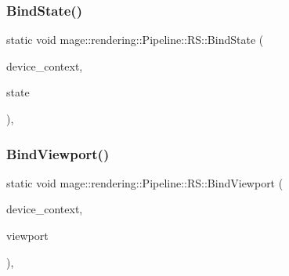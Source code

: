 \hypertarget{structmage_1_1rendering_1_1_pipeline_1_1_r_s_a828e80ca97ec6827434864cf8115766d}{}\label{structmage_1_1rendering_1_1_pipeline_1_1_r_s_a828e80ca97ec6827434864cf8115766d} 
\subsubsection{\texorpdfstring{Bind\+State()}{BindState()}}
{\footnotesize\ttfamily static void mage\+::rendering\+::\+Pipeline\+::\+R\+S\+::\+Bind\+State (\begin{DoxyParamCaption}\item[{I\+D3\+D11\+Device\+Context \&}]{device\+\_\+context,  }\item[{I\+D3\+D11\+Rasterizer\+State $\ast$}]{state }\end{DoxyParamCaption})\hspace{0.3cm}{\ttfamily [static]}, {\ttfamily [noexcept]}}

\hypertarget{structmage_1_1rendering_1_1_pipeline_1_1_r_s_a9d44e3f07e0bd12c736b46b7b05693f7}{}\label{structmage_1_1rendering_1_1_pipeline_1_1_r_s_a9d44e3f07e0bd12c736b46b7b05693f7} 
\subsubsection{\texorpdfstring{Bind\+Viewport()}{BindViewport()}}
{\footnotesize\ttfamily static void mage\+::rendering\+::\+Pipeline\+::\+R\+S\+::\+Bind\+Viewport (\begin{DoxyParamCaption}\item[{I\+D3\+D11\+Device\+Context \&}]{device\+\_\+context,  }\item[{const D3\+D11\+\_\+\+V\+I\+E\+W\+P\+O\+RT \&}]{viewport }\end{DoxyParamCaption})\hspace{0.3cm}{\ttfamily [static]}, {\ttfamily [noexcept]}}

\hypertarget{structmage_1_1rendering_1_1_pipeline_1_1_r_s_a0df7ca670ab1b0a0fe31591a8f90885c}{}\label{structmage_1_1rendering_1_1_pipeline_1_1_r_s_a0df7ca670ab1b0a0fe31591a8f90885c} 
